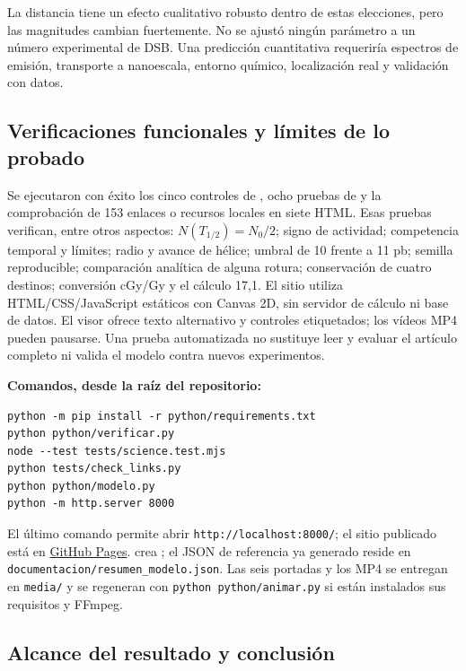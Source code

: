 \documentclass[11pt,a4paper,oneside]{article}
\begin{document}
La distancia tiene un efecto cualitativo robusto dentro de estas elecciones, pero las magnitudes cambian fuertemente. No se ajustó ningún parámetro a un número experimental de DSB. Una predicción cuantitativa requeriría espectros de emisión, transporte a nanoescala, entorno químico, localización real y validación con datos.

\subsection{Verificaciones funcionales y límites de lo probado}\label{verificaciones-funcionales-y-luxedmites-de-lo-probado}

Se ejecutaron con éxito los cinco controles de , ocho pruebas de  y la comprobación de 153 enlaces o recursos locales en siete HTML. Esas pruebas verifican, entre otros aspectos: \(N(T_{1/2})=N_0/2\); signo de actividad; competencia temporal y límites; radio y avance de hélice; umbral de 10 frente a 11 pb; semilla reproducible; comparación analítica de alguna rotura; conservación de cuatro destinos; conversión cGy/Gy y el cálculo 17,1. El sitio utiliza HTML/CSS/JavaScript estáticos con Canvas 2D, sin servidor de cálculo ni base de datos. El visor ofrece texto alternativo y controles etiquetados; los vídeos MP4 pueden pausarse. Una prueba automatizada no sustituye leer y evaluar el artículo completo ni valida el modelo contra nuevos experimentos.

\textbf{Comandos, desde la raíz del repositorio:}

\begin{verbatim}
python -m pip install -r python/requirements.txt
python python/verificar.py
node --test tests/science.test.mjs
python tests/check_links.py
python python/modelo.py
python -m http.server 8000
\end{verbatim}

El último comando permite abrir \texttt{http://localhost:8000/}; el sitio publicado está en \href{https://morganestampadoscol.github.io/radiogenoma-subatomica/}{GitHub Pages}.  crea ; el JSON de referencia ya generado reside en \texttt{documentacion/resumen\_modelo.json}. Las seis portadas y los MP4 se entregan en \texttt{media/} y se regeneran con \texttt{python\ python/animar.py} si están instalados sus requisitos y FFmpeg.

\subsection{Alcance del resultado y conclusión}\label{alcance-del-resultado-y-conclusiuxf3n}
\end{document}
